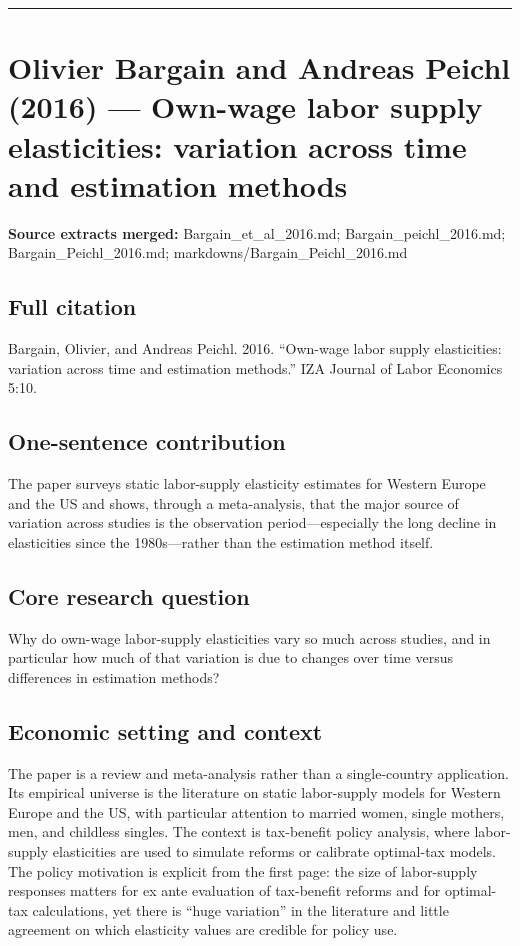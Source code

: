 \documentclass[11pt,a4paper]{article}
\begin{document}
\medskip\hrule\medskip

\section*{Olivier Bargain and Andreas Peichl (2016) — Own-wage labor supply elasticities: variation across time and estimation methods}

\textbf{Source extracts merged:} Bargain\_et\_al\_2016.md; Bargain\_peichl\_2016.md; Bargain\_Peichl\_2016.md; markdowns/Bargain\_Peichl\_2016.md

\subsection*{Full citation}
Bargain, Olivier, and Andreas Peichl. 2016. “Own-wage labor supply elasticities: variation across time and estimation methods.” IZA Journal of Labor Economics 5:10.

\subsection*{One-sentence contribution}
The paper surveys static labor-supply elasticity estimates for Western Europe and the US and shows, through a meta-analysis, that the major source of variation across studies is the observation period—especially the long decline in elasticities since the 1980s—rather than the estimation method itself.

\subsection*{Core research question}
Why do own-wage labor-supply elasticities vary so much across studies, and in particular how much of that variation is due to changes over time versus differences in estimation methods?

\subsection*{Economic setting and context}
The paper is a review and meta-analysis rather than a single-country application. Its empirical universe is the literature on static labor-supply models for Western Europe and the US, with particular attention to married women, single mothers, men, and childless singles. The context is tax-benefit policy analysis, where labor-supply elasticities are used to simulate reforms or calibrate optimal-tax models. The policy motivation is explicit from the first page: the size of labor-supply responses matters for ex ante evaluation of tax-benefit reforms and for optimal-tax calculations, yet there is “huge variation” in the literature and little agreement on which elasticity values are credible for policy use.
\end{document}

